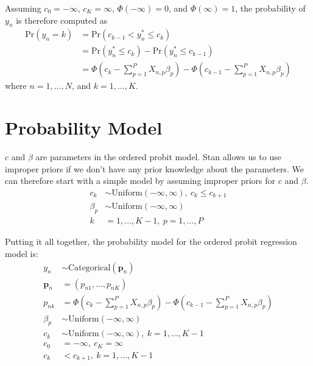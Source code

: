 \documentclass[12pt]{article}
\def\eqa{\left(c_k - \sum \limits_{p=1}^P X_{n,p}\beta_p \right)}
\def\eqb{\left(c_{k-1} - \sum \limits_{p=1}^P X_{n,p}\beta_p \right)}
\begin{document}
Assuming $c_0=-\infty$, $c_K=\infty$, $\Phi\left(-\infty\right)=0$, and $\Phi\left(\infty\right)=1$, the probability of $y_n$ is therefore computed as
\begin{align*}
 \mathrm{Pr}\left(y_n=k\right)&=\mathrm{Pr}\left(c_{k-1}<y^*_n\leq c_k\right)\\
 &= \mathrm{Pr}\left(y^*_n\leq c_k \right) - \mathrm{Pr}\left(y^*_n\leq c_{k-1} \right) \\
 &= \Phi \eqa - \Phi \eqb
\end{align*}
where $n=1,\ldots, N$, and $k=1, \ldots, K$.

\section{Probability Model}

$c$ and $\beta$ are parameters in the ordered probit model. Stan allows us to use improper priors if we don't have any prior knowledge about the parameters. We can therefore start with a simple model by assuming improper priors for $c$ and $\beta$.
\begin{align*}
  c_k &\sim \mathrm{Uniform}\left(-\infty, \infty \right), \ c_k \leq c_{k+1}\\
  \beta_p &\sim \mathrm{Uniform}\left(-\infty, \infty \right)\\
  k &=1,\ldots,K-1, \  p=1,\ldots,P
\end{align*}

Putting it all together, the probability model for the ordered probit regression model is:
\begin{align*}
  y_n &\sim \mathrm{Categorical} \left(\mathbf{p}_n\right) \\
  \mathbf{p}_n &=\left(p_{n1},\ldots,p_{nK} \right) \\
  p_{nk} &= \Phi \eqa - \Phi \eqb \\
  \beta_p &\sim \mathrm{Uniform}\left(-\infty, \infty \right)\\
  c_k &\sim \mathrm{Uniform}\left(-\infty, \infty \right), \ k=1,\ldots,K-1 \\
  c_0 &= -\infty, \ c_K = \infty \\
  c_k &< c_{k+1}, \ k=1,\ldots,K-1
\end{align*}
\end{document}
